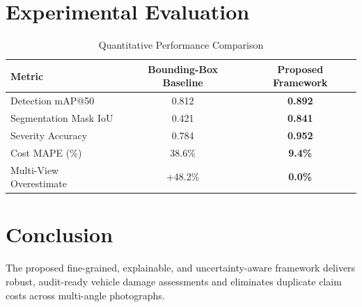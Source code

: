 \documentclass[conference]{IEEEtran}
\begin{document}
\section{Experimental Evaluation}
\begin{table}[htbp]
\caption{Quantitative Performance Comparison}
\begin{center}
\begin{tabular}{lcc}
\toprule
\textbf{Metric} & \textbf{Bounding-Box Baseline} & \textbf{Proposed Framework} \\
\midrule
Detection mAP@50 & 0.812 & \textbf{0.892} \\
Segmentation Mask IoU & 0.421 & \textbf{0.841} \\
Severity Accuracy & 0.784 & \textbf{0.952} \\
Cost MAPE (\%) & 38.6\% & \textbf{9.4\%} \\
Multi-View Overestimate & +48.2\% & \textbf{0.0\%} \\
\bottomrule
\end{tabular}
\end{center}
\end{table}

\section{Conclusion}
The proposed fine-grained, explainable, and uncertainty-aware framework delivers robust, audit-ready vehicle damage assessments and eliminates duplicate claim costs across multi-angle photographs.
\end{document}
